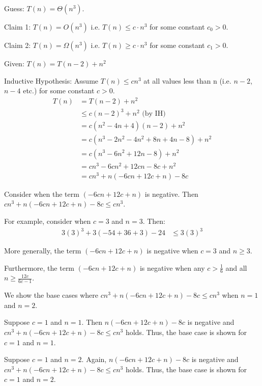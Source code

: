 \documentclass[a4paper]{report}
\begin{document}
\begin{enumerate}
      Guess: $T(n) = \Theta(n^3)$.

      Claim 1: $T(n) = O(n^3)$ i.e. $T(n) \leq c \cdot n^3$ for some constant $c_{0}>0$.

      Claim 2: $T(n) = \Omega(n^3)$ i.e. $T(n) \geq c \cdot n^3$ for some constant $c_{1}>0$.

      Given: $T(n) = T(n-2) + n^2$

      Inductive Hypothesis: Assume $T(n) \leq cn^3$ at all values less than n (i.e. $n-2$, $n-4$ etc.) for some constant $c>0$.
      \begin{align}
        T(n) &= T(n-2) + n^2  \\
        &\leq c(n-2)^3 + n^2  \text{         (by IH)}\\
        &= c(n^2 - 4n + 4)(n-2) + n^2 \\
        &= c(n^3 - 2n^2 - 4n^2 + 8n + 4n - 8) + n^2 \\
        &= c(n^3 - 6n^2 + 12n - 8) + n^2  \\
        &= cn^3 - 6cn^2 + 12cn - 8c + n^2  \\
        &= cn^3 + n(-6cn + 12c + n) - 8c   
      \end{align}

      Consider when the term $(-6cn + 12c + n)$ is negative. Then
      $cn^3 + n(-6cn + 12c + n) - 8c \leq cn^3$.

      For example, consider when $c=3$ and $n = 3$. Then:
      \begin{align}
        3(3)^3 + 3(-54 + 36 + 3) - 24 &\leq 3(3)^3
      \end{align}

      More generally, the term $(-6cn + 12c +n)$ is negative when 
      $c=3$ and $n \geq 3$.

      Furthermore, the term $(-6cn + 12c +n)$ is negative when  
      any $c>\frac{1}{6}$ and all $n \geq \frac{12c}{6c-1}$. 

      We show the base cases where 
      $cn^3 + n(-6cn + 12c + n) - 8c \leq cn^3$ when $n=1$ and $n=2$.

      Suppose $c=1$ and $n=1$. Then $n(-6cn + 12c + n) - 8c$ is negative and 
      $cn^3 + n(-6cn + 12c + n) - 8c \leq cn^3$ holds. Thus, the base case
      is shown for $c=1$ and $n=1$.

      Suppose $c=1$ and $n=2$. Again, $n(-6cn + 12c + n) - 8c$ is negative and 
      $cn^3 + n(-6cn + 12c + n) - 8c \leq cn^3$ holds. Thus, the base case
      is shown for $c=1$ and $n=2$.


\end{enumerate}
\end{document}
